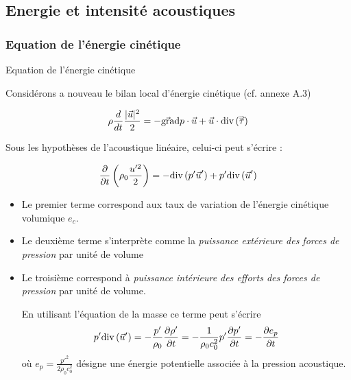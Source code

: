 \subsection{Energie et intensité acoustiques}

\subsubsection{Equation de l'énergie cinétique}
\begin{frame}{Equation de l'énergie cinétique}

\small


Considérons a nouveau le bilan local d'énergie cinétique (cf. annexe A.3)



\begin{equation}
		\rho \displaystyle \frac{d }{dt} \frac{ |\vec{u}|^2}{2} 
		=   - \vec{\mbox{\rm gra}}\mbox{\rm d} p \cdot {\vec u} + \vec{u} \cdot \mbox{\rm div}\, ( \accentset{\Rightarrow}{\tau} )
\end{equation}

Sous les hypothèses de l'acoustique linéaire, celui-ci peut s'écrire :

\begin{equation}
		 \displaystyle \frac{\partial }{\partial t} \left( \rho_0 \frac{u'^2}{2} \right)
		 = - \mbox{\rm div}\,( p' {\vec u}' ) + p' \mbox{\rm div}\,( {\vec u}' )  
\end{equation}


\pause

\begin{itemize}
\item
	Le premier terme correspond aux taux de variation de l'énergie cinétique volumique $e_c$.
\item
	Le deuxième terme s'interprète comme la {\em puissance extérieure des forces de pression} par unité de volume
\item
 	Le troisième correspond à {\em puissance intérieure des efforts des forces de pression} par unité de volume.

	En utilisant l'équation de la masse ce terme peut s'écrire	
	\[
		p' \mbox{\rm div}\, ( \vec{u}') = - \frac{p'}{\rho_0} \displaystyle \frac{\partial \rho'}{\partial t}  = -\frac{1}{ \rho_0 c_0^2} p'  \displaystyle \frac{\partial p'}{\partial t}  = -\displaystyle \frac{\partial e_p}{\partial t}
	\]
	où $e_p =  \frac{p'^2}{2 \rho_0 c_0^2}$ désigne une énergie potentielle associée à la pression acoustique.
\end{itemize}

\pause

\vspace{0mm}

\end{frame}


